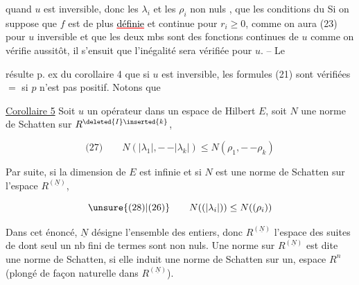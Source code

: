 quand $u$ est inversible,  donc  les $\lambda_i$ et les $\rho_i$ non nuls , que les conditions du   Si on suppose que $f$ est de plus \textcolor{red}{\uline{\textcolor{black}{définie}}} et continue pour $r_i\geq0$, comme on aura (23) pour  $u$ inversible et que les deux mbs sont des fonctions continues de $u$ comme on vérifie aussitôt, il s'ensuit que l'inégalité sera vérifiée pour  $u$. -- Le

 résulte p. ex du corollaire 4 que si $u$ est inversible, les formules (21) sont vérifiées $=$ si $p$ n'est pas positif. Notons que 

\reversemarginpar
{}
\normalmarginpar

\uline{Corollaire 5} Soit $u$ un opérateur dans un espace de Hilbert $E$, soit $N$ une norme de Schatten sur $R^{\deleted{I}\inserted{k}}$,   

\[
\text{(27)}\qquad N(|\lambda_1|,\mathord{-}\,\mathord{-}|\lambda_k|)\leq N(\rho_1,\mathord{-}\,\mathord{-}\rho_k)
\]

 Par suite, si la dimension de $E$ est infinie et si $N$ est une norme de Schatten sur  l'espace $R^{(\underline N)}$,  

\[
\text{\unsure{(28)|(26)}}\qquad N((|\lambda_i|))\leq N((\rho_i))
\]

Dans cet énoncé, $\underline N$ désigne l'ensemble des entiers, donc $R^{(\underline N)}$ l'espace des suites de   dont seul un nb fini de termes sont non nuls. Une norme sur $R^{(\underline N)}$ est dite une norme de Schatten, si elle induit une norme de Schatten sur  un, espace $R^n$ (plongé de façon naturelle dans $R^{(\underline N)}$).

\reversemarginpar
{}
\normalmarginpar
